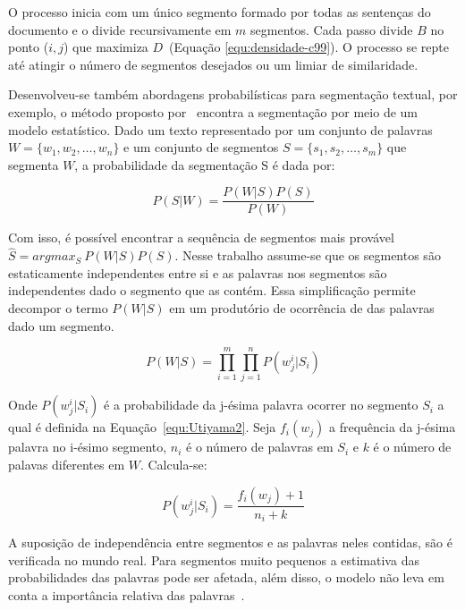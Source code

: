 O processo inicia com um único segmento formado por todas as sentenças do documento e o divide recursivamente em $m$ segmentos. Cada passo divide $B$ no ponto ($i,j$) que maximiza $D$~(Equação \ref{equ:densidade-c99}). O processo se repte até atingir o número de segmentos desejados ou um limiar de similaridade.







Desenvolveu-se também abordagens probabilísticas para segmentação textual, por exemplo, o método proposto por~\cite{Utiyama2001} encontra a segmentação por meio de um modelo estatístico. Dado um texto representado por um conjunto de palavras 
$W = \{w_1, w_2, \dots, w_n\}$ e um conjunto de segmentos $S = \{s_1, s_2, \dots, s_m\}$ que segmenta $W$, a probabilidade da segmentação S é dada por:

\begin{equation}
	P(S|W) = \frac{P(W|S)P(S)}{P(W)}
\end{equation}

Com isso, é possível encontrar a sequência de segmentos mais provável $\hat{S} = arg max_S~P(W|S) P(S)$. Nesse trabalho assume-se que os segmentos são estaticamente independentes entre si e as palavras nos segmentos são independentes dado o segmento que as contém. Essa simplificação permite decompor o termo $P(W|S)$ em um produtório de ocorrência de das palavras dado um segmento.  

\begin{equation}
	P(W|S) = \prod_{i=1}^m \prod_{j=1}^n P(w_j^i|S_i)
\end{equation}

Onde $P(w_j^i|S_i)$ é a probabilidade da j-ésima palavra ocorrer no segmento $S_i$ a qual é definida na Equação~\ref{equ:Utiyama2}. Seja $f_i(w_j)$ a frequência da j-ésima palavra no i-ésimo segmento, $n_i$ é o número de palavras em $S_i$ e $k$ é o número de palavas diferentes em $W$. Calcula-se: 

\begin{equation}
	P(w_j^i|S_i) = \frac{f_i(w_j) + 1}{n_i + k}
	\label{equ:Utiyama2}
\end{equation}

A suposição de independência entre segmentos e as palavras neles contidas, são é verificada no mundo real. Para segmentos muito pequenos a estimativa das probabilidades das palavras pode ser afetada, além disso, o modelo não leva em conta a importância relativa das palavras~\cite{Malioutov:2006a}.

